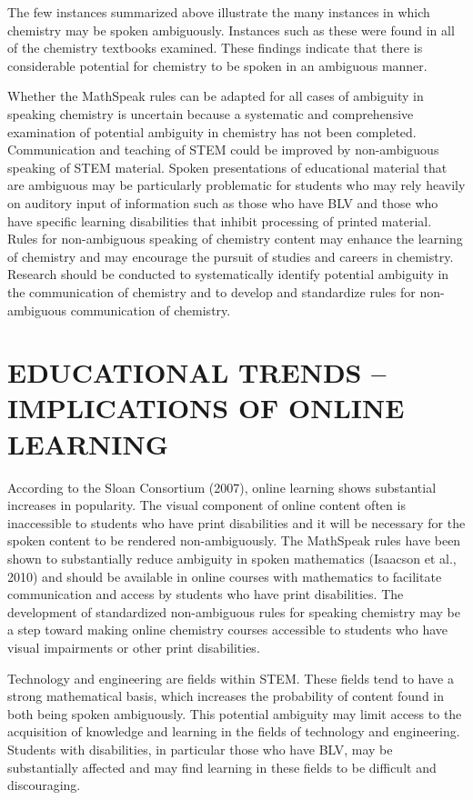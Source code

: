 \documentclass[11.5pt]{sig-alternate} %
\begin{document}
\begin{large}
The few instances summarized above illustrate the many instances in which chemistry may be spoken ambiguously. Instances such as these were found in all of the chemistry textbooks examined. These findings indicate that there is considerable potential for chemistry to be spoken in an ambiguous manner.

Whether the MathSpeak rules can be adapted for all cases of ambiguity in speaking chemistry is uncertain because a systematic and comprehensive examination of potential ambiguity in chemistry has not been completed. Communication and teaching of STEM could be improved by non-ambiguous speaking of STEM material. Spoken presentations of educational material that are ambiguous may be particularly problematic for students who may rely heavily on auditory input of information such as those who have BLV and those who have specific learning disabilities that inhibit processing of printed material. Rules for non-ambiguous speaking of chemistry content may enhance the learning of chemistry and may encourage the pursuit of studies and careers in chemistry. Research should be conducted to systematically identify potential ambiguity in the communication of chemistry and to develop and standardize rules for non-ambiguous communication of chemistry. 

\section*{EDUCATIONAL TRENDS – IMPLICATIONS OF ONLINE LEARNING}

According to the Sloan Consortium (2007), online learning shows substantial increases in popularity. The visual component of online content often is inaccessible to students who have print disabilities and it will be necessary for the spoken content to be rendered non-ambiguously. The MathSpeak rules have been shown to substantially reduce ambiguity in spoken mathematics (Isaacson et al., 2010) and should be available in online courses with mathematics to facilitate communication and access by students who have print disabilities. The development of standardized non-ambiguous rules for speaking chemistry may be a step toward making online chemistry courses accessible to students who have visual impairments or other print disabilities.

Technology and engineering are fields within STEM. These fields tend to have a strong mathematical basis, which increases the probability of content found in both being spoken ambiguously. This potential ambiguity may limit access to the acquisition of knowledge and learning in the fields of technology and engineering. Students with disabilities, in particular those who have BLV, may be substantially affected and may find learning in these fields to be difficult and discouraging.  


\end{large}
\end{document}
